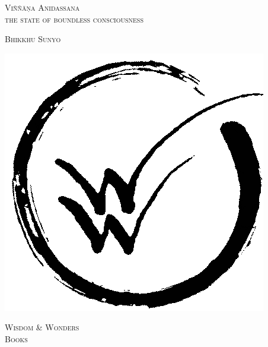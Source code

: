 \documentclass[10pt, openright]{book}
\begin{document}
\begin{center}
\vspace{2em}

\Huge\Titlefont\scshape{Viññāṇa Anidassana}\\
\vspace{0.5em}
\large\Titlefont\scshape{the state of boundless consciousness}\\

\begin{Large}
\vspace{4em}
\Titlefont\scshape{Bhikkhu Sunyo}
\end{Large}


\vspace*{\fill}
\includegraphics[scale=0.06, trim = 0 13 5 0 ]{../_resources/images/icons/logo-enso-large}\\
\vspace{4pt}
\begin{small}
\scshape{Wisdom \& Wonders\\
Books}
\end{small}
\end{center}
\end{document}
